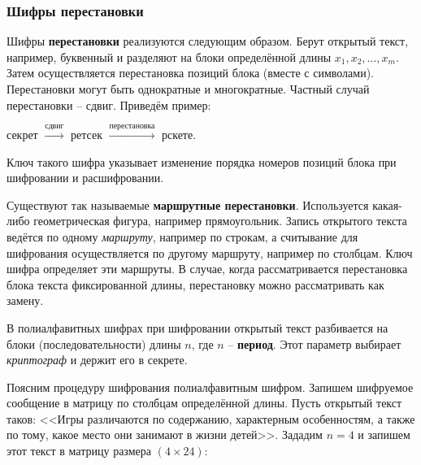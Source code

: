 \subsubsection{Шифры перестановки}

Шифры \textbf{перестановки} реализуются следующим образом. Берут открытый текст, например, буквенный и разделяют на блоки определённой длины $x_1, x_2, \dots, x_m$. Затем осуществляется перестановка позиций блока (вместе с символами). Перестановки могут быть однократные и многократные. Частный случай перестановки -- сдвиг. Приведём пример:
\begin{center}
    секрет $\xrightarrow{\text{сдвиг}}$ ретсек $\xrightarrow{\text{перестановка}}$ рскете.
\end{center}
Ключ такого шифра указывает изменение порядка номеров позиций блока при шифровании и расшифровании.

Существуют так называемые \textbf{маршрутные перестановки}. Используется какая-либо геометрическая фигура, например прямоугольник. Запись открытого текста ведётся по одному \emph{маршруту}, например по строкам, а считывание для шифрования осуществляется по другому маршруту, например по столбцам. Ключ шифра определяет эти маршруты.
В случае, когда рассматривается перестановка блока текста фиксированной длины, перестановку можно рассматривать как замену.

В полиалфавитных шифрах при шифровании открытый текст разбивается на блоки (последовательности) длины $n$, где $n$ -- \textbf{период}. Этот параметр выбирает \emph{криптограф} и держит его в секрете.

Поясним процедуру шифрования полиалфавитным шифром. Запишем шифруемое сообщение в матрицу по столбцам определённой длины. Пусть открытый текст таков: <<Игры различаются по содержанию, характерным особенностям, а также по тому, какое место они занимают в жизни детей>>. Зададим $n=4$ и запишем этот текст в матрицу размера $(4 \times 24)$:

\begin{center}  \end{center}

